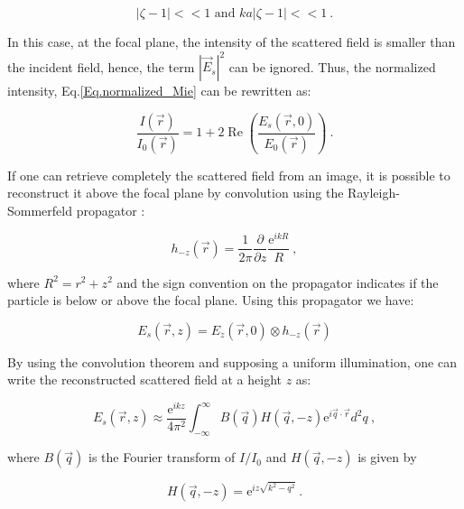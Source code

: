 \begin{equation}
	|\zeta - 1| << 1 \text{ and } ka|\zeta - 1| << 1 ~.
\end{equation}

In this case, at the focal plane, the intensity of the scattered field is smaller than the incident field, hence, the term $|\vec{E}_s|^2$ can be ignored. Thus, the normalized intensity, Eq.\ref{Eq.normalized_Mie} can be rewritten as:

\begin{equation}
\frac{I(\vec{r})}{I_0(\vec{r})}= 1 + 2\operatorname{Re}\left( \frac{E_s(\vec{r},0)}{E_0(\vec{r})} \right) ~.
\end{equation}

If one can retrieve completely the scattered field from an image, it is possible to reconstruct it above the focal plane by convolution using the Rayleigh-Sommerfeld propagator \cite{goodman_introduction_2005}:

\begin{equation}
	h_{-z}(\vec{r}) = \frac{1}{2 \pi} \frac{\partial}{\partial z} \frac{\mathrm{e}^{ikR}}{R} ~,
	\label{Eq:propagator}
\end{equation}

where $ R^2 = r^2 + z^2 $ and the sign convention on the propagator indicates if the particle is below or above the focal plane. Using this propagator we have:

\begin{equation}
	E_s(\vec{r}, z) = E_z(\vec{r}, 0) \otimes h_{-z}(\vec{r})
\end{equation}

By using the convolution theorem \cite{cheong_strategies_2010, goodman_introduction_2005, sherman_application_1967,schnars_digital_1994} and supposing a uniform illumination, one can write the reconstructed scattered field at a height $z$ as:

\begin{equation}
	E_s(\vec{r}, z) \approx \frac{\mathrm{e}^{ikz}}{4\pi ^2}
	\int ^\infty _{- \infty}
	B(\vec{q}) H(\vec{q}, -z) \mathrm{e}^{i \vec{q} \cdot \vec{r}} d^2 q
	\label{Eq.RS} ~,
\end{equation}

where $B(\vec{q})$ is the Fourier transform of $I/I_0$ and $H(\vec{q}, -z)$ is given by

\begin{equation}
	H(\vec{q}, -z) = \mathrm{e}^{iz \sqrt{k^2 - q^2}} ~.
\end{equation}

